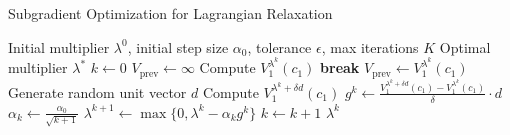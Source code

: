 \documentclass[11pt]{article}
\begin{document}
\begin{algorithm}[H]
\caption{Subgradient Optimization for Lagrangian Relaxation}
\begin{algorithmic}[1]
\Require Initial multiplier $\lambda^0$, initial step size $\alpha_0$, tolerance $\epsilon$, max iterations $K$
\Ensure Optimal multiplier $\lambda^*$
\State $k \gets 0$
\State $V_{\text{prev}} \gets \infty$
    \State Compute $V^{\lambda^k}_{1}(c_{1})$ 
        \State \textbf{break} 
    \EndIf
    \State $V_{\text{prev}} \gets V^{\lambda^k}_{1}(c_{1})$
    \State Generate random unit vector $d$
    \State Compute $V^{\lambda^k + \delta d}_{1}(c_{1})$ 
    \State $g^k \gets \frac{V^{\lambda^k + \delta d}_{1}(c_{1}) - V^{\lambda^k}_{1}(c_{1})}{\delta} \cdot d$ 
    \State $\alpha_k \gets \frac{\alpha_0}{\sqrt{k+1}}$ 
    \State $\lambda^{k+1} \gets \max\{0, \lambda^k - \alpha_k g^k\}$ 
    \State $k \gets k + 1$
\EndWhile
\State \Return $\lambda^k$
\end{algorithmic}
\end{algorithm}

\vspace{0.5cm}






\end{document}
